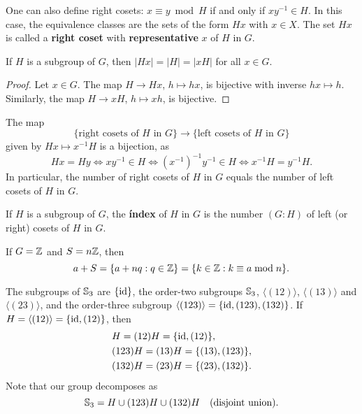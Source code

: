 One can also define right cosets: $x\equiv
y\bmod H$ if and only if $xy^{-1}\in H$. In this case, 
the equivalence classes are 
the sets of the form $Hx$ with $x\in X$. The set $Hx$ 
is called a \textbf{right coset}
with \textbf{representative} $x$ of $H$ in $G$. 

\begin{proposition}
    If $H$ is a subgroup of $G$, then  $|Hx|=|H|=|xH|$ for all $x\in G$.
\end{proposition}

\begin{proof}
    Let $x\in G$. The map $H\to Hx$, $h\mapsto hx$, is bijective 
    with inverse $hx\mapsto h$. Similarly, the map $H\to xH$,
    $h\mapsto xh$, is bijective.
\end{proof}

The map 
\[
        \{\text{right cosets of $H$ in $G$}\}\to\{\text{left cosets of $H$ in $G$}\}
\]
given by $Hx\mapsto x^{-1}H$ is a bijection, as 
\[
        Hx=Hy
        \Longleftrightarrow xy^{-1}\in H
        \Longleftrightarrow (x^{-1})^{-1}y^{-1}\in H
        \Longleftrightarrow x^{-1}H=y^{-1}H.
\]
In particular, the number of right cosets of $H$ in $G$
equals the number of left cosets of $H$ in $G$. 

\begin{definition}
    If $H$ is a subgroup of $G$, the \textbf{índex} of $H$ in $G$
    is the number $(G:H)$ of left (or right) cosets of $H$ in $G$. 
\end{definition}

\begin{example}
    If $G=\mathbb{Z}$ and $S=n\mathbb{Z}$, then 
    \[
    a+S=\{a+nq:q\in\mathbb{Z}\}=\{k\in\mathbb{Z}:k\equiv a\bmod n\}.
    \]
\end{example}
    
\begin{example}
    The subgroups of $\mathbb{S}_3$ are $\{\operatorname{id}\}$, the order-two subgroups 
    $\mathbb{S}_3$, $\langle(12)\rangle$, 
    $\langle(13)\rangle$ and $\langle(23)\rangle$, and 
    the order-three subgroup $\langle(123)\rangle=\{\operatorname{id},(123),(132)\}$.  
    If $H=\langle(12)\rangle=\{\operatorname{id},(12)\}$, then 
    \begin{align*}
    &H=(12)H=\{\operatorname{id},(12)\},\\
    &(123)H=(13)H=\{(13),(123)\},\\
    &(132)H=(23)H=\{(23),(132)\}.
    \end{align*}
    Note that our group decomposes as 
    \[
    \mathbb{S}_3=H\cup (123)H\cup (132)H\quad\text{(disjoint union)}.
    \]
    \end{example}

